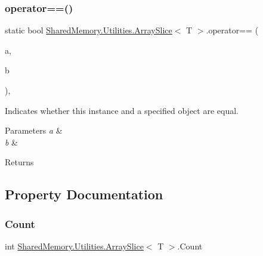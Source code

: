 \subsubsection{\texorpdfstring{operator==()}{operator==()}}
{\footnotesize\ttfamily static bool \hyperlink{struct_shared_memory_1_1_utilities_1_1_array_slice}{Shared\+Memory.\+Utilities.\+Array\+Slice}$<$ T $>$.operator== (\begin{DoxyParamCaption}\item[{\hyperlink{struct_shared_memory_1_1_utilities_1_1_array_slice}{Array\+Slice}$<$ T $>$}]{a,  }\item[{\hyperlink{struct_shared_memory_1_1_utilities_1_1_array_slice}{Array\+Slice}$<$ T $>$}]{b }\end{DoxyParamCaption})\hspace{0.3cm}{\ttfamily [inline]}, {\ttfamily [static]}}



Indicates whether this instance and a specified object are equal.


\begin{DoxyParams}{Parameters}
{\em a} & \\
\hline
{\em b} & \\
\hline
\end{DoxyParams}
\begin{DoxyReturn}{Returns}

\end{DoxyReturn}


\subsection{Property Documentation}
\mbox{\label{struct_shared_memory_1_1_utilities_1_1_array_slice_a5ab8162c11faf02450fff26c1f3f16cd}} 
\subsubsection{\texorpdfstring{Count}{Count}}
{\footnotesize\ttfamily int \hyperlink{struct_shared_memory_1_1_utilities_1_1_array_slice}{Shared\+Memory.\+Utilities.\+Array\+Slice}$<$ T $>$.Count\hspace{0.3cm}{\ttfamily [get]}}



